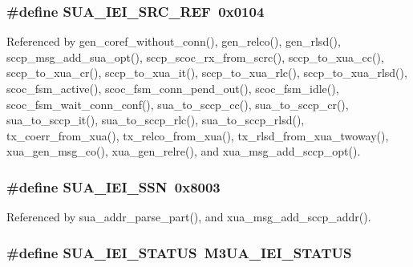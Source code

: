 \subsubsection[{S\+U\+A\+\_\+\+I\+E\+I\+\_\+\+S\+R\+C\+\_\+\+R\+EF}]{\setlength{\rightskip}{0pt plus 5cm}\#define S\+U\+A\+\_\+\+I\+E\+I\+\_\+\+S\+R\+C\+\_\+\+R\+EF~0x0104}\label{sua_8h_a73a750c45cc17f2e295b3181b2532e2a}


Referenced by gen\+\_\+coref\+\_\+without\+\_\+conn(), gen\+\_\+relco(), gen\+\_\+rlsd(), sccp\+\_\+msg\+\_\+add\+\_\+sua\+\_\+opt(), sccp\+\_\+scoc\+\_\+rx\+\_\+from\+\_\+scrc(), sccp\+\_\+to\+\_\+xua\+\_\+cc(), sccp\+\_\+to\+\_\+xua\+\_\+cr(), sccp\+\_\+to\+\_\+xua\+\_\+it(), sccp\+\_\+to\+\_\+xua\+\_\+rlc(), sccp\+\_\+to\+\_\+xua\+\_\+rlsd(), scoc\+\_\+fsm\+\_\+active(), scoc\+\_\+fsm\+\_\+conn\+\_\+pend\+\_\+out(), scoc\+\_\+fsm\+\_\+idle(), scoc\+\_\+fsm\+\_\+wait\+\_\+conn\+\_\+conf(), sua\+\_\+to\+\_\+sccp\+\_\+cc(), sua\+\_\+to\+\_\+sccp\+\_\+cr(), sua\+\_\+to\+\_\+sccp\+\_\+it(), sua\+\_\+to\+\_\+sccp\+\_\+rlc(), sua\+\_\+to\+\_\+sccp\+\_\+rlsd(), tx\+\_\+coerr\+\_\+from\+\_\+xua(), tx\+\_\+relco\+\_\+from\+\_\+xua(), tx\+\_\+rlsd\+\_\+from\+\_\+xua\+\_\+twoway(), xua\+\_\+gen\+\_\+msg\+\_\+co(), xua\+\_\+gen\+\_\+relre(), and xua\+\_\+msg\+\_\+add\+\_\+sccp\+\_\+opt().

\subsubsection[{S\+U\+A\+\_\+\+I\+E\+I\+\_\+\+S\+SN}]{\setlength{\rightskip}{0pt plus 5cm}\#define S\+U\+A\+\_\+\+I\+E\+I\+\_\+\+S\+SN~0x8003}\label{sua_8h_a9e052f80babde6806c2f66a91a3b2b89}


Referenced by sua\+\_\+addr\+\_\+parse\+\_\+part(), and xua\+\_\+msg\+\_\+add\+\_\+sccp\+\_\+addr().

\subsubsection[{S\+U\+A\+\_\+\+I\+E\+I\+\_\+\+S\+T\+A\+T\+US}]{\setlength{\rightskip}{0pt plus 5cm}\#define S\+U\+A\+\_\+\+I\+E\+I\+\_\+\+S\+T\+A\+T\+US~{\bf M3\+U\+A\+\_\+\+I\+E\+I\+\_\+\+S\+T\+A\+T\+US}}\label{sua_8h_ab203a62d74c9c69e210b1ec6e16305d5}
